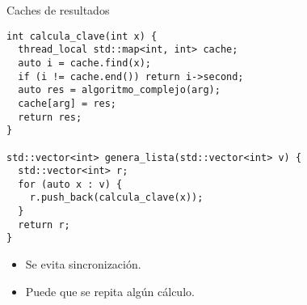 \begin{frame}[t,fragile]{Caches de resultados}
\begin{lstlisting}
int calcula_clave(int x) {
  thread_local std::map<int, int> cache;
  auto i = cache.find(x);
  if (i != cache.end()) return i->second;
  auto res = algoritmo_complejo(arg);
  cache[arg] = res;
  return res;
}

std::vector<int> genera_lista(std::vector<int> v) {
  std::vector<int> r;
  for (auto x : v) {
    r.push_back(calcula_clave(x));
  }
  return r;
}
\end{lstlisting}
\begin{itemize}
  \item Se evita sincronización.
  \item Puede que se repita algún cálculo.
\end{itemize}
\end{frame}

